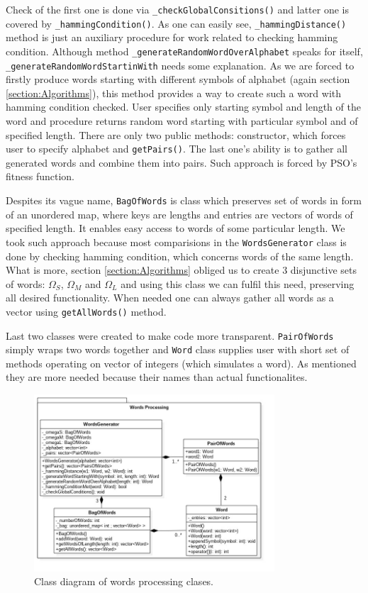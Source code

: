 \documentclass{article}
\begin{document}
Check of the first one is done via \texttt{\_checkGlobalConsitions()} and latter one is covered by \texttt{\_hammingCondition()}. As one can easily see, \texttt{\_hammingDistance()} method is just an auxiliary procedure for work related to checking hamming condition. Although method \texttt{\_generateRandomWordOverAlphabet} speaks for itself, \texttt{\_generateRandomWordStartinWith} needs some explanation. As we are forced to firstly produce words starting with different symbols of alphabet (again section \ref{section:Algorithms}), this method provides a way to create such a word with hamming condition checked. User specifies only starting symbol and length of the word and procedure returns random word starting with particular symbol and of specified length. There are only two public methods: constructor, which forces user to specify alphabet and \texttt{getPairs()}. The last one's ability is to gather all generated words and combine them into pairs. Such approach is forced by PSO's fitness function. 

Despites its vague name, \texttt{BagOfWords} is class which preserves set of words in form of an unordered map, where keys are lengths and entries are vectors of words of specified length. It enables easy access to words of some particular length. We took such approach because most comparisions in the \texttt{WordsGenerator} class is done by checking hamming condition, which concerns words of the same length. What is more, section \ref{section:Algorithms} obliged us to create 3 disjunctive sets of words: $\Omega_S$, $\Omega_M$ and $\Omega_L$ and using this class we can fulfil this need, preserving all desired functionality. When needed one can always gather all words as a vector using \texttt{getAllWords()} method.

Last two classes were created to make code more transparent. \texttt{PairOfWords} simply wraps two words together and \texttt{Word} class supplies user with short set of methods operating on vector of integers (which simulates a word). As mentioned they are more needed because their names than actual functionalites.

\begin{figure}[H]
	\centering
	\includegraphics[width=0.8\textwidth]{images/words_processing.jpg}
    \caption{Class diagram of words processing clases.}
    \label{fig:words_processing_class}
\end{figure}
\end{document}
